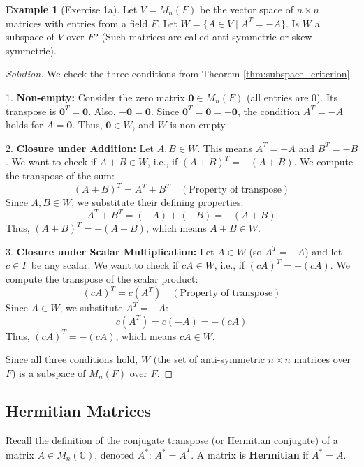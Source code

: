 \documentclass[11pt]{article}
\theoremstyle{definition}
\newtheorem{example}[theorem]{Example}
\theoremstyle{remark}
\newcommand{\zerovec}{\mathbf{0}}
\begin{document}
\begin{example}[Exercise 1a]
Let $V = M_n(F)$ be the vector space of $n \times n$ matrices with entries from a field $F$. Let $W = \{ A \in V \mid A^T = -A \}$. Is $W$ a subspace of $V$ over $F$? (Such matrices are called anti-symmetric or skew-symmetric).

\begin{proof}[Solution]
We check the three conditions from Theorem \ref{thm:subspace_criterion}.

1.  \textbf{Non-empty:} Consider the zero matrix $\zerovec \in M_n(F)$ (all entries are 0). Its transpose is $\zerovec^T = \zerovec$. Also, $-\zerovec = \zerovec$. Since $\zerovec^T = \zerovec = -\zerovec$, the condition $A^T = -A$ holds for $A=\zerovec$. Thus, $\zerovec \in W$, and $W$ is non-empty.

2.  \textbf{Closure under Addition:} Let $A, B \in W$. This means $A^T = -A$ and $B^T = -B$. We want to check if $A+B \in W$, i.e., if $(A+B)^T = -(A+B)$.
    We compute the transpose of the sum:
    \[ (A+B)^T = A^T + B^T \quad (\text{Property of transpose}) \]
    Since $A, B \in W$, we substitute their defining properties:
    \[ A^T + B^T = (-A) + (-B) = -(A+B) \]
    Thus, $(A+B)^T = -(A+B)$, which means $A+B \in W$.

3.  \textbf{Closure under Scalar Multiplication:} Let $A \in W$ (so $A^T = -A$) and let $c \in F$ be any scalar. We want to check if $cA \in W$, i.e., if $(cA)^T = -(cA)$.
    We compute the transpose of the scalar product:
    \[ (cA)^T = c(A^T) \quad (\text{Property of transpose}) \]
    Since $A \in W$, we substitute $A^T = -A$:
    \[ c(A^T) = c(-A) = -(cA) \]
    Thus, $(cA)^T = -(cA)$, which means $cA \in W$.

Since all three conditions hold, $W$ (the set of anti-symmetric $n \times n$ matrices over $F$) is a subspace of $M_n(F)$ over $F$.
\end{proof}
\end{example}

\subsection{Hermitian Matrices}
Recall the definition of the conjugate transpose (or Hermitian conjugate) of a matrix $A \in M_n(\mathbb{C})$, denoted $A^*$: $A^* = \bar{A}^T$. A matrix is \textbf{Hermitian} if $A^* = A$.
\end{document}
